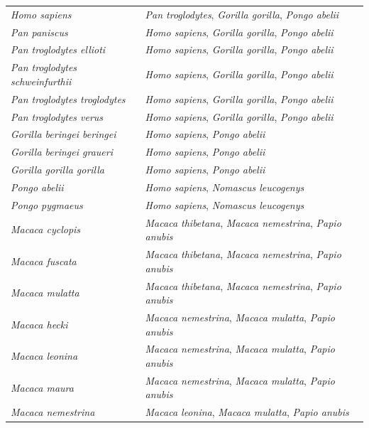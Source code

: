 \begin{center}
\begin{longtable}{p{} p{}}
        \textit{Homo sapiens} & \textit{Pan troglodytes}, \textit{Gorilla gorilla}, \textit{Pongo abelii} \\
        \textit{Pan paniscus} & \textit{Homo sapiens}, \textit{Gorilla gorilla}, \textit{Pongo abelii} \\
        \textit{Pan troglodytes ellioti} & \textit{Homo sapiens}, \textit{Gorilla gorilla}, \textit{Pongo abelii} \\
        \textit{Pan troglodytes schweinfurthii} & \textit{Homo sapiens}, \textit{Gorilla gorilla}, \textit{Pongo abelii} \\
        \textit{Pan troglodytes troglodytes} & \textit{Homo sapiens}, \textit{Gorilla gorilla}, \textit{Pongo abelii} \\
        \textit{Pan troglodytes verus} & \textit{Homo sapiens}, \textit{Gorilla gorilla}, \textit{Pongo abelii} \\
        \textit{Gorilla beringei beringei} & \textit{Homo sapiens}, \textit{Pongo abelii} \\
        \textit{Gorilla beringei graueri} & \textit{Homo sapiens}, \textit{Pongo abelii} \\
        \textit{Gorilla gorilla gorilla} & \textit{Homo sapiens}, \textit{Pongo abelii} \\
        \textit{Pongo abelii} & \textit{Homo sapiens}, \textit{Nomascus leucogenys} \\
        \textit{Pongo pygmaeus} & \textit{Homo sapiens}, \textit{Nomascus leucogenys} \\
        \textit{Macaca cyclopis} & \textit{Macaca thibetana}, \textit{Macaca nemestrina}, \textit{Papio anubis} \\
        \textit{Macaca fuscata} & \textit{Macaca thibetana}, \textit{Macaca nemestrina}, \textit{Papio anubis} \\
        \textit{Macaca mulatta} & \textit{Macaca thibetana}, \textit{Macaca nemestrina}, \textit{Papio anubis} \\
        \textit{Macaca hecki} & \textit{Macaca nemestrina}, \textit{Macaca mulatta}, \textit{Papio anubis} \\
        \textit{Macaca leonina} & \textit{Macaca nemestrina}, \textit{Macaca mulatta}, \textit{Papio anubis} \\
        \textit{Macaca maura} & \textit{Macaca nemestrina}, \textit{Macaca mulatta}, \textit{Papio anubis} \\
        \textit{Macaca nemestrina} & \textit{Macaca leonina}, \textit{Macaca mulatta}, \textit{Papio anubis} \\

\end{longtable}
\end{center}
